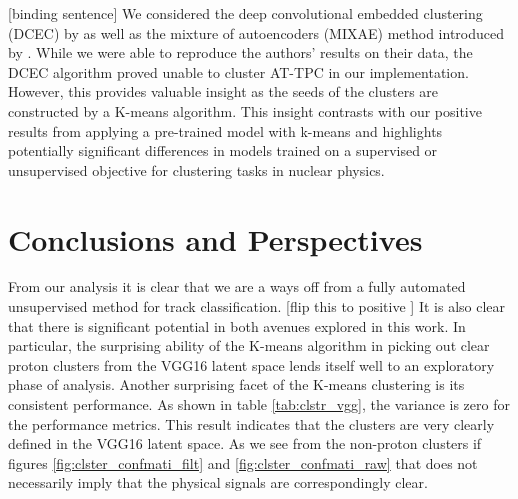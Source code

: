 \documentclass[review,number,sort&compress]{elsarticle}
\begin{document}
{\color{orange}[binding sentence]}
We considered the deep convolutional embedded clustering (DCEC) by \citet{Guo2017} as well as the mixture of autoencoders (MIXAE) method introduced by \citet{Zhang}. While we were able to reproduce the authors' results on their data, the DCEC algorithm proved unable to cluster AT-TPC in our implementation. However, this provides valuable insight as the seeds of the clusters are constructed by a K-means algorithm. This insight contrasts with our positive results from applying a pre-trained model with k-means and highlights potentially significant differences in models trained on a supervised or unsupervised objective for clustering tasks in nuclear physics. 


\section{Conclusions and Perspectives}\label{sec{conclusion}}

From our analysis it is clear that we are a ways off from a fully automated unsupervised method for track classification. {\color{orange}[flip this to positive ]} It is also clear that there is significant potential in both avenues explored in this work. 
In particular, the surprising ability of the K-means algorithm in picking out clear proton clusters from the VGG16 latent space lends itself well to an exploratory phase of analysis.
Another surprising facet of the K-means clustering is its consistent performance. As shown in table \ref{tab:clstr_vgg}, the variance is zero for the performance metrics. This result indicates that the clusters are very clearly defined in the VGG16 latent space. As we see from the non-proton clusters if figures \ref{fig:clster_confmati_filt} and \ref{fig:clster_confmati_raw}  that does not necessarily imply that the physical signals are correspondingly clear. 


\end{document}
